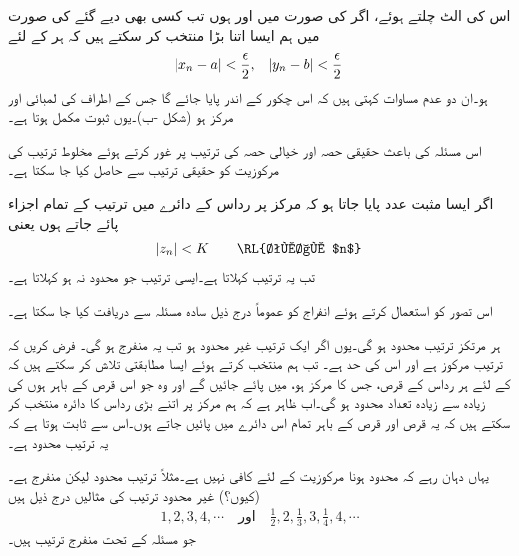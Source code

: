 اس کی الٹ چلتے ہوئے، اگر  کی صورت میں  اور  ہوں  تب کسی بھی دیے گئے  کی صورت میں ہم ایسا  اتنا بڑا منتخب کر سکتے ہیں کہ ہر  کے لئے 
\begin{align*}
\abs{x_n-a}<\frac{\epsilon}{2},\quad \abs{y_n-b}<\frac{\epsilon}{2}
\end{align*}
ہو۔ان دو عدم مساوات کہتی ہیں کہ  اس چکور کے اندر پایا جائے گا جس کے اطراف کی لمبائی  اور مرکز  ہو (شکل -ب)۔یوں ثبوت مکمل ہوتا ہے۔

اس مسئلہ کی باعث حقیقی حصہ اور خیالی حصہ کی ترتیب پر غور کرتے ہوئے مخلوط ترتیب کی مرکوزیت کو حقیقی ترتیب سے حاصل کیا جا سکتا ہے۔

اگر ایسا مثبت عدد  پایا جاتا ہو کہ مرکز پر رداس  کے دائرے میں ترتیب  کے تمام اجزاء  پائے جاتے ہوں  یعنی
\begin{align*}
\abs{z_n}<K \quad \quad \text{\RL{تمام $n$}}
\end{align*}
تب یہ ترتیب  کہلاتا  ہے۔ایسی ترتیب جو محدود نہ ہو  کہلاتا ہے۔

اس تصور کو استعمال کرتے ہوئے انفراج  کو عموماً درج ذیل سادہ مسئلہ  سے دریافت کیا جا سکتا ہے۔

ہر مرتکز ترتیب محدود ہو گی۔یوں اگر ایک ترتیب غیر محدود ہو تب یہ منفرج ہو گی۔
فرض کریں کہ ترتیب  مرکوز ہے اور اس کی حد  ہے۔ تب ہم  منتخب کرتے ہوئے ایسا مطابقتی  تلاش کر سکتے ہیں کہ   کے لئے ہر  رداس  کے قرص، جس کا مرکز  ہو، میں پائے جائیں گے اور وہ   جو اس قرص کے باہر ہوں کی زیادہ سے زیادہ تعداد محدود ہو گی۔اب ظاہر ہے کہ ہم مرکز پر اتنے بڑی  رداس  کا دائرہ منتخب کر سکتے ہیں کہ یہ قرص اور قرص کے باہر تمام  اس دائرے میں پائیں جاتے ہوں۔اس سے ثابت ہوتا ہے کہ یہ ترتیب محدود ہے۔

یہاں دہان رہے کہ محدود ہونا مرکوزیت کے لئے کافی نہیں ہے۔مثلاً ترتیب  محدود  لیکن منفرج ہے۔ (کیوں؟) غیر محدود ترتیب کی مثالیں درج ذیل ہیں
\begin{align*}
1,2,3,4,\cdots\quad \text{اور}\quad \frac{1}{2},2,\frac{1}{3},3,\frac{1}{4},4,\cdots
\end{align*} 
جو مسئلہ  کے تحت منفرج ترتیب ہیں۔

